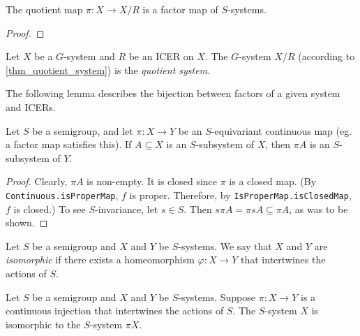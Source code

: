 \begin{theorem}
\label{theorem_quotient_map_is_factor_map}
\leanok{}
    The quotient map $\pi: X \to X/R$ is a factor map of $S$-systems.
\end{theorem}

\begin{proof}
\end{proof}

\begin{definition}
\label{def_quotient_system}
    Let $X$ be a $G$-system and $R$ be an ICER on $X$.  The $G$-system $X/R$ (according to \cref{thm_quotient_system}) is the \emph{quotient system}.
\end{definition}

The following lemma describes the bijection between factors of a given system and ICERs. 

\begin{lemma}
    \label{lemma_img_of_inv_is_inv}
    \leanok{}
    Let $S$ be a semigroup, and let $\pi: X \to Y$ be an $S$-equivariant continuous map (eg. a factor map satisfies this).  If $A \subseteq X$ is an $S$-subsystem of $X$, then $\pi A$ is an $S$-subsystem of $Y$.
\end{lemma}

\begin{proof}
\leanok{}
    Clearly, $\pi A$ is non-empty.  It is closed since $\pi$ is a closed map.  (By \verb|Continuous.isProperMap|, $f$ is proper. Therefore, by \verb|IsProperMap.isClosedMap|, $f$ is closed.)  To see $S$-invariance, let $s \in S$.  Then $s \pi A = \pi sA \subseteq \pi A$, as was to be shown.
\end{proof}

\begin{definition}
    \label{def_isomorphism}
    \leanok{}
    Let $S$ be a semigroup and $X$ and $Y$ be $S$-systems.  We say that $X$ and $Y$ are \emph{isomorphic} if there exists a homeomorphism $\varphi: X \to Y$ that intertwines the actions of $S$.
\end{definition}

\begin{theorem}
    \label{thm_system_is_isomorphic_to_injective_factor_image}
    Let $S$ be a semigroup and $X$ and $Y$ be $S$-systems.  Suppose $\pi: X \to Y$ is a continuous injection that intertwines the actions of $S$.  The $S$-system $X$ is isomorphic to the $S$-system $\pi X$.
\end{theorem}

